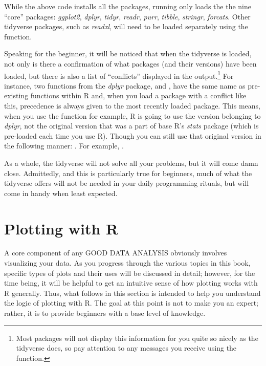 While the above code installs all the packages, running  only loads the the nine ``core'' packages:  \textit{ggplot2}, \textit{dplyr}, \textit{tidyr}, \textit{readr}, \textit{purr}, \textit{tibble}, \textit{stringr}, \textit{forcats}. Other tidyverse packages, such as \textit{readxl}, will need to be loaded separately using the  function.

Speaking for the beginner, it will be noticed that when the tidyverse is loaded, not only is there a confirmation of what packages (and their versions) have been loaded, but there is also a list of ``conflicts'' displayed in the output.\footnote{Most packages will not display this information for you quite so nicely as the tidyverse does, so pay attention to any messages you receive using the  function.} For instance, two functions from the \textit{dplyr} package,  and , have the same name as pre-existing functions within R and, when you load a package with a conflict like this, precedence is always given to the most recently loaded package. This means, when you use the  function for example, R is going to use the version belonging to \textit{dplyr}, not the original version that was a part of base R's \textit{stats} package (which is pre-loaded each time you use R). Though you can still use that original version in the following manner: .  For example, . 

As a whole, the tidyverse will not solve all your problems, but it will come damn close. Admittedly, and this is particularly true for beginners, much of what the tidyverse offers will not be needed in your daily programming rituals, but will come in handy when least expected.

\section{Plotting with R}

A core component of any GOOD DATA ANALYSIS obviously involves visualizing your data. As you progress through the various topics in this book, specific types of plots and their uses will be discussed in detail; however, for the time being, it will be helpful to get an intuitive sense of how plotting works with R generally. Thus, what follows in this section is intended to help you understand the logic of plotting with R. The goal at this point is not to make you an expert; rather, it is to provide beginners with a base level of knowledge.


